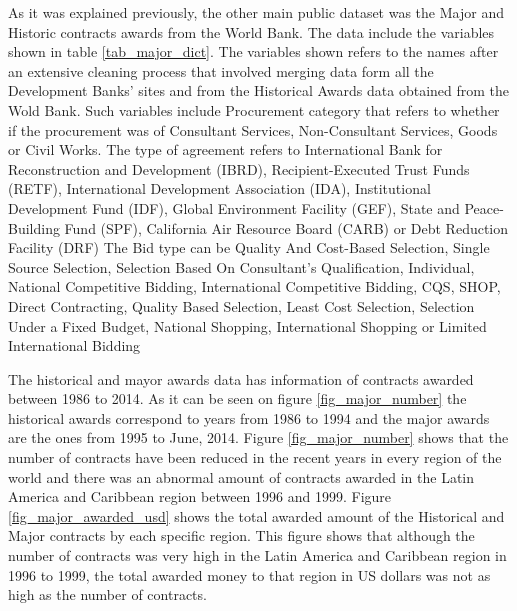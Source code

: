 As it was explained previously, the other main public dataset was the Major and Historic contracts awards from the World Bank. The data include the variables shown in table \ref{tab_major_dict}. The variables shown refers to the names after an extensive cleaning process that involved merging data form all the Development Banks' sites and from the Historical Awards data obtained from the Wold Bank. Such variables include Procurement category that refers to whether if the procurement was  of  Consultant Services, Non-Consultant Services, Goods or Civil Works. The type of agreement refers to  International Bank for Reconstruction and Development (IBRD),  
Recipient-Executed Trust Funds (RETF), International Development Association (IDA), Institutional Development Fund (IDF), Global Environment Facility (GEF), State and Peace-Building Fund (SPF), California Air Resource Board (CARB) or Debt Reduction Facility (DRF) The Bid type can be Quality And Cost-Based Selection, Single Source Selection, Selection Based On Consultant's Qualification, Individual, National Competitive Bidding, International Competitive Bidding, CQS, SHOP, Direct Contracting, Quality Based Selection, Least Cost Selection, Selection Under a Fixed Budget, National Shopping, International Shopping or Limited International Bidding

The historical and mayor awards data has information of contracts awarded between 1986 to 2014. As it can be seen on figure \ref{fig_major_number} the historical awards correspond to years from 1986 to 1994 and the major awards are the ones from 1995 to June, 2014. Figure \ref{fig_major_number} shows that  the number of contracts have been reduced in the recent years in every region of the world and there was an abnormal amount of contracts awarded in the Latin America and Caribbean region between 1996 and 1999.  Figure \ref{fig_major_awarded_usd}  shows the total awarded amount of the Historical and Major contracts by each specific region. This figure shows that although the number of contracts was very high in the Latin America and Caribbean region in 1996 to 1999, the total awarded money to that region in US dollars was not as high as the number of contracts. 



